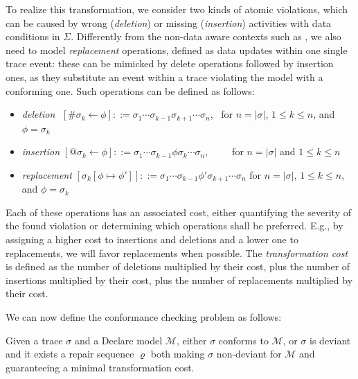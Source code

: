 To realize this transformation, we consider two kinds of atomic violations, which can be caused by wrong (\textit{deletion}) or missing (\textit{insertion}) activities with data conditions in $\Sigma$. Differently from the non-data aware contexts such as \cite{XuLZ17a,MaggiMCA18}, we also need to model \textit{replacement} operations, defined as data updates within one single trace event: these can be mimicked by delete operations followed by insertion ones, as they substitute an event within a trace violating the model  with a conforming one. Such operations can be defined as follows:
\begin{itemize}
	\item \textit{deletion}\,\, $[\#\sigma_k\leftarrow \phi]::= \sigma_1\cdots\sigma_{k-1}\sigma_{k+1}\cdots \sigma_n$,\,\,\, for $n=|\sigma|$, $1\leq k\leq n$, and $\phi=\sigma_k$
	\item \textit{insertion} $[@\sigma_k\leftarrow \phi]::= \sigma_1\cdots\sigma_{k-1}\phi\sigma_{k}\cdots \sigma_n$,\,\,\,\,\,\,\,\,\,\,\,\,\, for $n=|\sigma|$ and $1\leq k\leq n$
	\item \textit{replacement} $[\sigma_k[\phi\mapsto\phi']]::=\sigma_1\cdots \sigma_{k-1}\phi'\sigma_{k+1}\cdots\sigma_n$ for $n=|\sigma|$, $1\leq k\leq n$, and $\phi=\sigma_k$
\end{itemize}
Each of these operations has an associated cost, either quantifying the severity of the found violation or determining which operations shall be preferred. E.g., by assigning a higher cost to insertions and deletions and a lower one to replacements, we will favor replacements when possible. The \textit{transformation cost} is defined as the number of deletions multiplied by their cost, plus the number of insertions multiplied by their cost, plus the number of replacements multiplied by their cost.

We can now define the conformance checking problem as follows:
\begin{definition}
Given a trace $\sigma$ and a Declare model $\mathcal{M}$, either $\sigma$ conforms to $\mathcal{M}$, or $\sigma$ is deviant and it exists a repair sequence $\varrho$ both making $\sigma$ non-deviant for $\mathcal{M}$ and guaranteeing a minimal transformation cost.
\end{definition}

